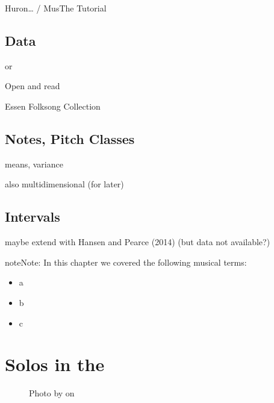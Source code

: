 \documentclass[letterpaper,10pt,english]{sphinxmanual}
\begin{document}
Huron… / MusThe Tutorial


\section{Data}
\label{\detokenize{3_folk_songs:data}}
or 

Open and read 

Essen Folksong Collection


\section{Notes, Pitch Classes}
\label{\detokenize{3_folk_songs:notes-pitch-classes}}

means, variance

also multidimensional (for later)


\section{Intervals}
\label{\detokenize{3_folk_songs:intervals}}

maybe extend with Hansen and Pearce (2014) (but data not available?)

\begin{sphinxadmonition}{note}{Note:}
In this chapter we covered the following musical terms:
\begin{itemize}
\item {} 
a

\item {} 
b

\item {} 
c

\end{itemize}
\end{sphinxadmonition}


\chapter{Solos in the }
\label{\detokenize{4_jazz_solos:solos-in-the-weimar-jazz-database}}\label{\detokenize{4_jazz_solos::doc}}
\begin{figure}[htbp]
\centering
\capstart

\noindent{}
\caption{Photo by 
on }\label{\detokenize{4_jazz_solos:id3}}\end{figure}
\end{document}
